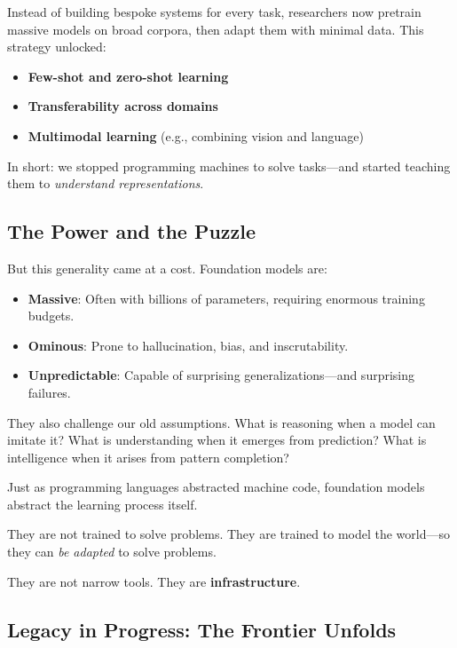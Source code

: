 Instead of building bespoke systems for every task, researchers now pretrain massive models on broad corpora, then adapt them with minimal data. This strategy unlocked:

\begin{itemize}
  \item \textbf{Few-shot and zero-shot learning}
  \item \textbf{Transferability across domains}
  \item \textbf{Multimodal learning} (e.g., combining vision and language)
\end{itemize}

In short: we stopped programming machines to solve tasks—and started teaching them to \emph{understand representations}.

\subsection{The Power and the Puzzle}

But this generality came at a cost. Foundation models are:

\begin{itemize}
  \item \textbf{Massive}: Often with billions of parameters, requiring enormous training budgets.
  \item \textbf{Ominous}: Prone to hallucination, bias, and inscrutability.
  \item \textbf{Unpredictable}: Capable of surprising generalizations—and surprising failures.
\end{itemize}

They also challenge our old assumptions. What is reasoning when a model can imitate it? What is understanding when it emerges from prediction? What is intelligence when it arises from pattern completion?

\begin{tcolorbox}[colback=gray!5!white, colframe=black!75!white, title={Foundation Models: A New Layer of Abstraction}]
Just as programming languages abstracted machine code,  
foundation models abstract the learning process itself.

They are not trained to solve problems.  
They are trained to model the world—so they can \emph{be adapted} to solve problems.

They are not narrow tools.  
They are \textbf{infrastructure}.
\end{tcolorbox}

\subsection{Legacy in Progress: The Frontier Unfolds}

